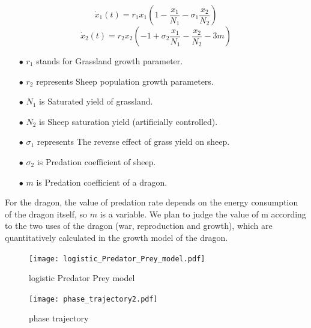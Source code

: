 \documentclass[12pt]{article}  %
\newenvironment{shrinkeq}[1]
{ \bgroup
	\addtolength\abovedisplayshortskip{#1}
	\addtolength\abovedisplayskip{#1}
	\addtolength\belowdisplayshortskip{#1}
	\addtolength\belowdisplayskip{#1}}
{\egroup\ignorespacesafterend}
\begin{document}
\begin{shrinkeq}{-1ex}
	\begin{equation}
    \label{eq:eq17}
	 \dot{x}_1(t)=r_1 x_1\left(1-\frac{x_1}{N_1}-\sigma_1 \frac{x_2}{N_2}\right)
	\end{equation}
\end{shrinkeq}
\begin{shrinkeq}{-1ex}
	\begin{equation}
    \label{eq:eq18}
	 \dot{x}_2(t)=r_2 x_2\left(-1+\sigma_2 \frac{x_1}{N_1}-\frac{x_2}{N_2}-3m\right)
	\end{equation}
\end{shrinkeq}
\begin{itemize}
\vspace{-0.2cm}
\item[$\bullet$] \textbf{$r_1$ }stands for Grassland growth parameter. 
\vspace{-0.2cm}
\item[$\bullet$] \textbf{$r_2$ }represents Sheep population growth parameters.
\vspace{-0.2cm}
\item[$\bullet$] \textbf{$N_1$ }is Saturated yield of grassland.
\vspace{-0.2cm}
\item[$\bullet$] \textbf{$N_2$ }is Sheep saturation yield (artificially controlled).
\vspace{-0.2cm}
\item[$\bullet$] \textbf{$\sigma_1$ }represents The reverse effect of grass yield on sheep.
\vspace{-0.2cm}
\item[$\bullet$] \textbf{$\sigma_2$ }is Predation coefficient of sheep.
\vspace{-0.2cm}
\item[$\bullet$] \textbf{$m$ }is Predation coefficient of a dragon.
\end{itemize}
\vspace{-0.3cm}

For the dragon, the value of predation rate depends on the energy consumption of the dragon itself, so $m$ is a variable. We plan to judge the value of m according to the two uses of the dragon (war, reproduction and growth), which are quantitatively calculated in the growth model of the dragon.
\begin{figure}[htbp]
	\centering
	\begin{minipage}[t]{0.45\textwidth}
		\centering
		\texttt{[image: logistic\_Predator\_Prey\_model.pdf]}
		\caption{logistic Predator Prey model}
	\end{minipage}
	\begin{minipage}[t]{0.45\textwidth}
		\centering
		\texttt{[image: phase\_trajectory2.pdf]}
		\caption{phase trajectory}
	\end{minipage}
\end{figure}
\end{document}

